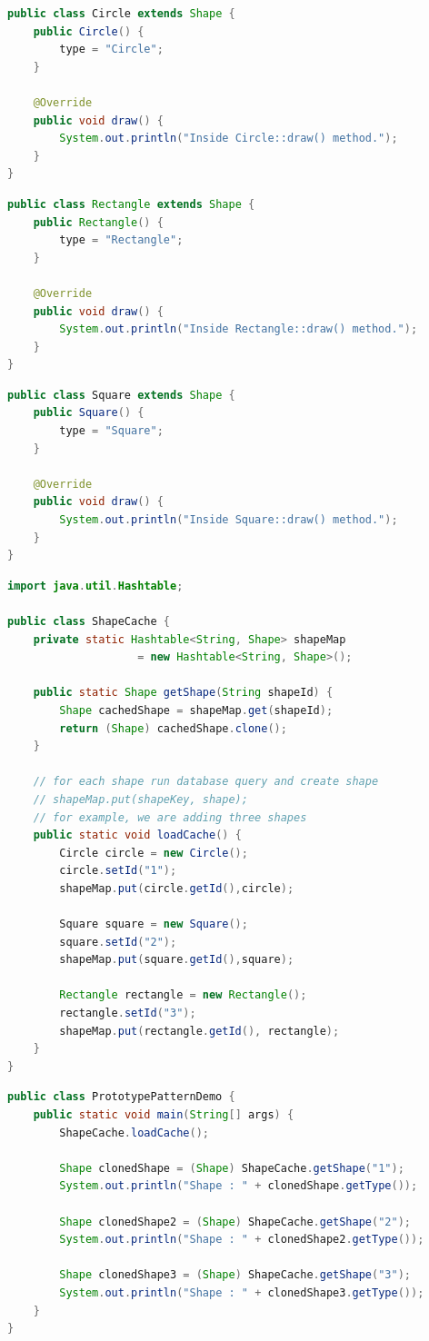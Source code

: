 \begin{lstlisting}[language=Java, title=Circle.java]
public class Circle extends Shape {
    public Circle() {
        type = "Circle";
    }

    @Override
    public void draw() {
        System.out.println("Inside Circle::draw() method.");
    }
}
\end{lstlisting}

\begin{lstlisting}[language=Java, title=Rectangle.java]
public class Rectangle extends Shape {
    public Rectangle() {
        type = "Rectangle";
    }

    @Override
    public void draw() {
        System.out.println("Inside Rectangle::draw() method.");
    }
}
\end{lstlisting}

\begin{lstlisting}[language=Java, title=Square.java]
public class Square extends Shape {
    public Square() {
        type = "Square";
    }

    @Override
    public void draw() {
        System.out.println("Inside Square::draw() method.");
    }
}
\end{lstlisting}

\begin{lstlisting}[language=Java, title=ShapeCache.java]
import java.util.Hashtable;

public class ShapeCache {
    private static Hashtable<String, Shape> shapeMap 
                    = new Hashtable<String, Shape>();

    public static Shape getShape(String shapeId) {
        Shape cachedShape = shapeMap.get(shapeId);
        return (Shape) cachedShape.clone();
    }

    // for each shape run database query and create shape
    // shapeMap.put(shapeKey, shape);
    // for example, we are adding three shapes
    public static void loadCache() {
        Circle circle = new Circle();
        circle.setId("1");
        shapeMap.put(circle.getId(),circle);

        Square square = new Square();
        square.setId("2");
        shapeMap.put(square.getId(),square);

        Rectangle rectangle = new Rectangle();
        rectangle.setId("3");
        shapeMap.put(rectangle.getId(), rectangle);
    }
}
\end{lstlisting}

\begin{lstlisting}[language=Java, title=PrototypePatternDemo.java]
public class PrototypePatternDemo {
    public static void main(String[] args) {
        ShapeCache.loadCache();

        Shape clonedShape = (Shape) ShapeCache.getShape("1");
        System.out.println("Shape : " + clonedShape.getType());

        Shape clonedShape2 = (Shape) ShapeCache.getShape("2");
        System.out.println("Shape : " + clonedShape2.getType());

        Shape clonedShape3 = (Shape) ShapeCache.getShape("3");
        System.out.println("Shape : " + clonedShape3.getType());
    }
}
\end{lstlisting}


